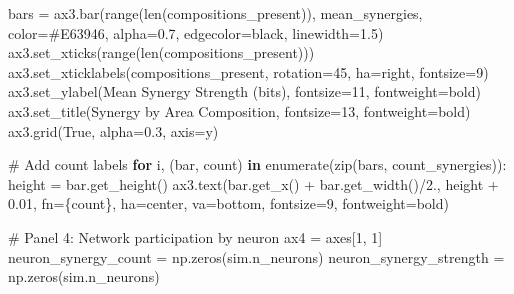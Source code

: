 \documentclass[
  11pt,
  letterpaper,
  oneside,
  openany]{book}
\newenvironment{Shaded}{\begin{snugshade}}{\end{snugshade}}
\newcommand{\BuiltInTok}[1]{\textcolor[rgb]{0.00,0.23,0.31}{#1}}
\newcommand{\CommentTok}[1]{\textcolor[rgb]{0.37,0.37,0.37}{#1}}
\newcommand{\ControlFlowTok}[1]{\textcolor[rgb]{0.00,0.23,0.31}{\textbf{#1}}}
\newcommand{\DecValTok}[1]{\textcolor[rgb]{0.68,0.00,0.00}{#1}}
\newcommand{\FloatTok}[1]{\textcolor[rgb]{0.68,0.00,0.00}{#1}}
\newcommand{\KeywordTok}[1]{\textcolor[rgb]{0.00,0.23,0.31}{\textbf{#1}}}
\newcommand{\NormalTok}[1]{\textcolor[rgb]{0.00,0.23,0.31}{#1}}
\newcommand{\OperatorTok}[1]{\textcolor[rgb]{0.37,0.37,0.37}{#1}}
\newcommand{\SpecialCharTok}[1]{\textcolor[rgb]{0.37,0.37,0.37}{#1}}
\newcommand{\SpecialStringTok}[1]{\textcolor[rgb]{0.13,0.47,0.30}{#1}}
\newcommand{\StringTok}[1]{\textcolor[rgb]{0.13,0.47,0.30}{#1}}
\newcommand{\VariableTok}[1]{\textcolor[rgb]{0.07,0.07,0.07}{#1}}
\begin{document}
\begin{Shaded}
\begin{Highlighting}[]
\NormalTok{bars }\OperatorTok{=}\NormalTok{ ax3.bar(}\BuiltInTok{range}\NormalTok{(}\BuiltInTok{len}\NormalTok{(compositions\_present)), mean\_synergies, }
\NormalTok{              color}\OperatorTok{=}\StringTok{\textquotesingle{}\#E63946\textquotesingle{}}\NormalTok{, alpha}\OperatorTok{=}\FloatTok{0.7}\NormalTok{, edgecolor}\OperatorTok{=}\StringTok{\textquotesingle{}black\textquotesingle{}}\NormalTok{, linewidth}\OperatorTok{=}\FloatTok{1.5}\NormalTok{)}
\NormalTok{ax3.set\_xticks(}\BuiltInTok{range}\NormalTok{(}\BuiltInTok{len}\NormalTok{(compositions\_present)))}
\NormalTok{ax3.set\_xticklabels(compositions\_present, rotation}\OperatorTok{=}\DecValTok{45}\NormalTok{, ha}\OperatorTok{=}\StringTok{\textquotesingle{}right\textquotesingle{}}\NormalTok{, fontsize}\OperatorTok{=}\DecValTok{9}\NormalTok{)}
\NormalTok{ax3.set\_ylabel(}\StringTok{\textquotesingle{}Mean Synergy Strength (bits)\textquotesingle{}}\NormalTok{, fontsize}\OperatorTok{=}\DecValTok{11}\NormalTok{, fontweight}\OperatorTok{=}\StringTok{\textquotesingle{}bold\textquotesingle{}}\NormalTok{)}
\NormalTok{ax3.set\_title(}\StringTok{\textquotesingle{}Synergy by Area Composition\textquotesingle{}}\NormalTok{, fontsize}\OperatorTok{=}\DecValTok{13}\NormalTok{, fontweight}\OperatorTok{=}\StringTok{\textquotesingle{}bold\textquotesingle{}}\NormalTok{)}
\NormalTok{ax3.grid(}\VariableTok{True}\NormalTok{, alpha}\OperatorTok{=}\FloatTok{0.3}\NormalTok{, axis}\OperatorTok{=}\StringTok{\textquotesingle{}y\textquotesingle{}}\NormalTok{)}

\CommentTok{\# Add count labels}
\ControlFlowTok{for}\NormalTok{ i, (bar, count) }\KeywordTok{in} \BuiltInTok{enumerate}\NormalTok{(}\BuiltInTok{zip}\NormalTok{(bars, count\_synergies)):}
\NormalTok{    height }\OperatorTok{=}\NormalTok{ bar.get\_height()}
\NormalTok{    ax3.text(bar.get\_x() }\OperatorTok{+}\NormalTok{ bar.get\_width()}\OperatorTok{/}\FloatTok{2.}\NormalTok{, height }\OperatorTok{+} \FloatTok{0.01}\NormalTok{,}
            \SpecialStringTok{f\textquotesingle{}n=}\SpecialCharTok{\{}\NormalTok{count}\SpecialCharTok{\}}\SpecialStringTok{\textquotesingle{}}\NormalTok{, ha}\OperatorTok{=}\StringTok{\textquotesingle{}center\textquotesingle{}}\NormalTok{, va}\OperatorTok{=}\StringTok{\textquotesingle{}bottom\textquotesingle{}}\NormalTok{, fontsize}\OperatorTok{=}\DecValTok{9}\NormalTok{, fontweight}\OperatorTok{=}\StringTok{\textquotesingle{}bold\textquotesingle{}}\NormalTok{)}

\CommentTok{\# Panel 4: Network participation by neuron}
\NormalTok{ax4 }\OperatorTok{=}\NormalTok{ axes[}\DecValTok{1}\NormalTok{, }\DecValTok{1}\NormalTok{]}
\NormalTok{neuron\_synergy\_count }\OperatorTok{=}\NormalTok{ np.zeros(sim.n\_neurons)}
\NormalTok{neuron\_synergy\_strength }\OperatorTok{=}\NormalTok{ np.zeros(sim.n\_neurons)}


\end{Highlighting}
\end{Shaded}
\end{document}

